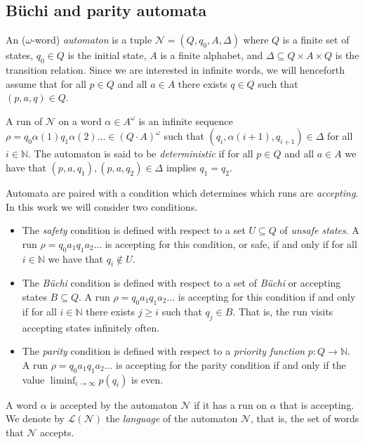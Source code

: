 \documentclass[runningheads,a4paper,draft]{llncs}
\newcommand{\calN}{\mathcal{N}}
\newcommand{\lang}[1]{\mathcal{L}({#1})}
\begin{document}
\subsection{B\"uchi and parity automata}
\begin{definition}
  An ($\omega$-word) \emph{automaton} is a tuple $\calN =
  (Q,q_0,A,\Delta)$ where $Q$ is a finite set of states, $q_0 \in Q$ is the
  initial state, $A$ is a finite alphabet, and $\Delta \subseteq Q \times A
  \times Q$ is the transition relation. Since we are interested in infinite
  words, we will henceforth assume that for all $p \in Q$ and all $a \in A$
  there exists $q \in Q$ such that $(p,a,q) \in Q$.
\end{definition}
A run of $\calN$ on a word $\alpha \in A^\omega$ is an infinite sequence $\rho =
q_0 \alpha(1) q_1 \alpha(2) \dots \in (Q\cdot A)^\omega$ such that
$(q_i,\alpha(i+1),q_{i+1}) \in \Delta$ for all $i \in \mathbb{N}$. The automaton
is said to be \emph{deterministic} if for all $p \in Q$ and all $a \in A$ we
have that $(p,a,q_1), (p,a,q_2) \in \Delta$ implies $q_1 = q_2$.

Automata are paired with a condition which determines which runs are
\emph{accepting}. In this work we will consider two conditions.
\begin{itemize}
  \item The \emph{safety} condition is defined with respect to a set $U
    \subseteq Q$ of \emph{unsafe states}. A run $\rho = q_0 a_1 q_1 a_2 \dots$
    is accepting for this condition, or safe, if and only if for all $i \in
    \mathbb{N}$ we have that $q_i \not\in U$.
  \item The \emph{B\"uchi} condition is defined with respect to a set of
    \emph{B\"uchi} or accepting states $B \subseteq Q$. A run $\rho = q_0
    a_1 q_1 a_2 \dots$ is accepting for this condition if and only if for
    all $i \in \mathbb{N}$ there exists $j \ge i$ such that $q_j \in B$.
    That is, the run visits accepting states infinitely often.
  \item The \emph{parity} condition is defined with respect to a
    \emph{priority function} $p : Q \to \mathbb{N}$. A run $\rho = q_0 a_1
    q_1 a_2 \dots$ is accepting for the parity condition if and only if the
    value $\liminf_{i \to \infty} p(q_i)$ is even.
\end{itemize}
A word $\alpha$ is accepted by the automaton $\calN$ if it has a run on
$\alpha$ that is accepting.  We denote by $\lang{\calN}$ the \emph{language} of
the automaton $\calN$, that is, the set of words that $\calN$ accepts.
\end{document}
